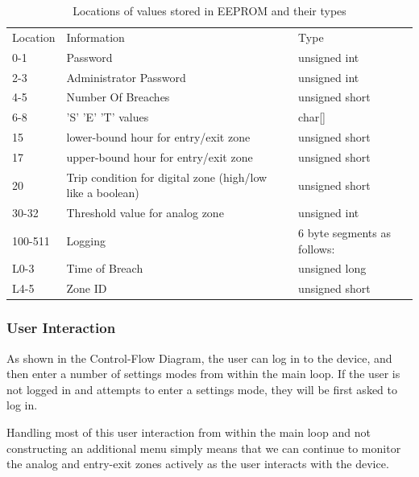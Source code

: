\documentclass[a4paper,11pt]{article}
\theoremstyle{mytheor}
\begin{document}
\begin{table}[]
\centering
\caption{Locations of values stored in EEPROM and their types}
\label{EEPROM Mapping}
\begin{tabular}{lll}
Location & Information                                               & Type                        \\
0-1      & Password                                                  & unsigned int                \\
2-3      & Administrator Password                                    & unsigned int                \\
4-5      & Number Of Breaches                                        & unsigned short              \\
6-8      & 'S' 'E' 'T' values                                        & char{[}{]}                  \\
15       & lower-bound hour for entry/exit zone                      & unsigned short              \\
17       & upper-bound hour for entry/exit zone                      & unsigned short              \\
20       & Trip condition for digital zone (high/low like a boolean) & unsigned short              \\
30-32    & Threshold value for analog zone                           & unsigned int                \\
100-511  & Logging                                                   & 6 byte segments as follows: \\
L0-3     & Time of Breach                                            & unsigned long               \\
L4-5     & Zone ID                                                   & unsigned short             
\end{tabular}
\end{table}

\subsubsection{User Interaction}
As shown in the Control-Flow Diagram, the user can log in to the device, and then enter a number of settings modes from within the main loop. If the user is not logged in and attempts to enter a settings mode, they will be first asked to log in.

Handling most of this user interaction from within the main loop and not constructing an additional menu simply means that we can continue to monitor the analog and entry-exit zones actively as the user interacts with the device.
\end{document}
